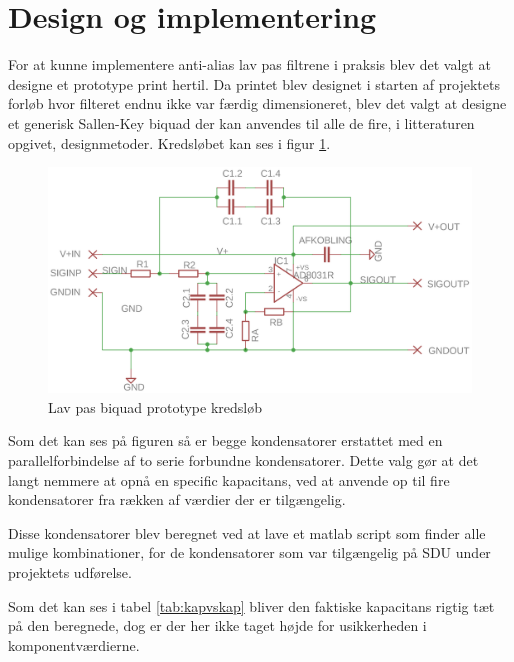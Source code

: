 \section{Design og implementering}\label{sec:filter_design}
For at kunne implementere anti-alias lav pas filtrene i praksis blev det valgt at designe et 
prototype print hertil. Da printet blev designet i starten af projektets forløb hvor filteret 
endnu ikke var færdig dimensioneret, blev det valgt at designe et generisk Sallen-Key biquad 
der kan anvendes til alle de fire, i litteraturen opgivet, designmetoder. Kredsløbet kan ses i 
figur \ref{fig:skbiquadsch}.



\begin{figure}[H]
	\includegraphics[width=\linewidth]{billeder/skbiquadsch}
	\caption{Lav pas biquad prototype kredsløb}
	\label{fig:skbiquadsch}
\end{figure}

Som det kan ses på figuren så er begge kondensatorer erstattet med en parallelforbindelse af 
to serie forbundne kondensatorer. Dette valg gør at det langt nemmere at opnå en specific 
kapacitans, ved at anvende op til fire kondensatorer fra rækken af værdier der er tilgængelig.

Disse kondensatorer blev beregnet ved at lave et matlab script som finder alle mulige kombinationer, for de kondensatorer som var tilgængelig på SDU under projektets udførelse.

Som det kan ses i tabel \ref{tab:kapvskap} bliver den faktiske kapacitans rigtig tæt på den
beregnede, dog er der her ikke taget højde for usikkerheden i komponentværdierne.

